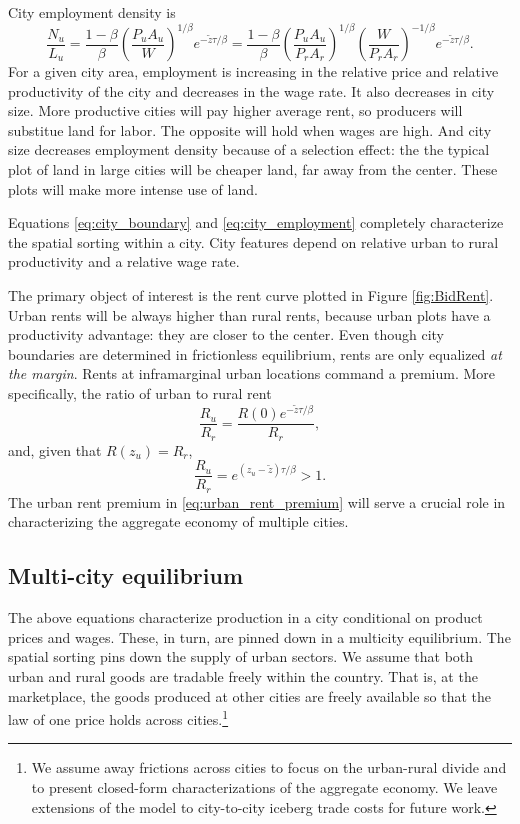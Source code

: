 \documentclass[12pt]{article}
\begin{document}
City employment density is
\begin{equation}\label{eq:city_employment}
\frac{N_u}{L_u} = \frac{1-\beta}{\beta} \left(\frac{P_uA_u}{W}\right)^{1/\beta} e^{-\tilde z\tau/\beta}
=\frac{1-\beta}{\beta}
	 \left(\frac{P_uA_u}{P_rA_r}\right)^{1/\beta}
	 \left(\frac{W}{P_rA_r}\right)^{-1/\beta}
	 e^{-\tilde z{\tau/\beta}}.
\end{equation}
For a given city area, employment is increasing in the relative price and relative productivity of the city and decreases in the wage rate. It also decreases in city size. More productive cities will pay higher average rent, so producers will substitue land for labor. The opposite will hold when wages are high. And city size decreases employment density because of a selection effect: the the typical plot of land in large cities will be cheaper land, far away from the center. These plots will make more intense use of land.

Equations \eqref{eq:city_boundary} and \eqref{eq:city_employment} completely characterize the spatial sorting within a city. City features depend on relative urban to rural productivity and a relative wage rate.

The primary object of interest is the rent curve plotted in Figure \ref{fig:BidRent}. Urban rents will be always higher than rural rents, because urban plots have a productivity advantage: they are closer to the center. Even though city boundaries are determined in frictionless equilibrium, rents are only equalized \emph{at the margin}. Rents at inframarginal urban locations command a premium. More specifically,
the ratio of urban to rural rent
\[
\frac{R_u}{R_r} = \frac{R(0)e^{-\tilde z \tau /\beta}} {R_r},
\]
and, given that $R(z_u)=R_r$,
\begin{equation}\label{eq:urban_rent_premium}
\frac{R_u}{R_r} = e^{(z_u-\tilde z) \tau /\beta}>1.
\end{equation}
The urban rent premium in \eqref{eq:urban_rent_premium} will serve a crucial role in characterizing the aggregate economy of multiple cities.

\subsection{Multi-city equilibrium}
The above equations characterize production in a city conditional on product prices and wages. These, in turn, are pinned down in a multicity equilibrium. The spatial sorting pins down the supply of urban sectors. We assume that both urban and rural goods are tradable freely within the country. That is, at the marketplace, the goods produced at other cities are freely available so that the law of one price holds across cities.\footnote{We assume away frictions across cities to focus on the urban-rural divide and to present closed-form characterizations of the aggregate economy. We leave extensions of the model to city-to-city iceberg trade costs for future work.}
\end{document}
